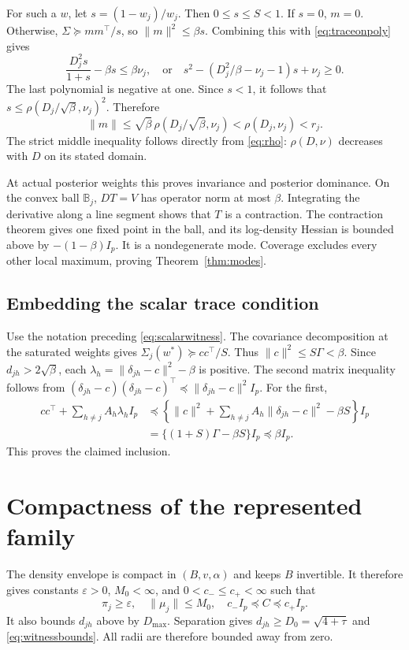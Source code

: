 \documentclass[12pt,a4paper]{article}
\theoremstyle{remark}
\begin{document}
For such a $w$, let $s=(1-w_j)/w_j$. Then $0\le s\le S<1$. If $s=0$, $m=0$. Otherwise, $\Sigma\succeq mm^\top/s$, so $\|m\|^2\le\beta s$. Combining this with \eqref{eq:traceonpoly} gives
\[
 \frac{D_j^2s}{1+s}-\beta s\le\beta\nu_j,
 \quad\text{or}\quad
 s^2-(D_j^2/\beta-\nu_j-1)s+\nu_j\ge0.
\]
The last polynomial is negative at one. Since $s<1$, it follows that
$s\le\rho(D_j/\sqrt\beta,\nu_j)^2$. Therefore
\[
 \|m\|\le\sqrt\beta\,\rho(D_j/\sqrt\beta,\nu_j)
           <\rho(D_j,\nu_j)<r_j.
\]
The strict middle inequality follows directly from \eqref{eq:rho}: $\rho(D,\nu)$ decreases with $D$ on its stated domain.

At actual posterior weights this proves invariance and posterior dominance. On the convex ball $\mathbb B_j$, $DT=V$ has operator norm at most $\beta$. Integrating the derivative along a line segment shows that $T$ is a contraction. The contraction theorem gives one fixed point in the ball, and its log-density Hessian is bounded above by $-(1-\beta)I_p$. It is a nondegenerate mode. Coverage excludes every other local maximum, proving Theorem~\ref{thm:modes}.

\subsection{Embedding the scalar trace condition}

Use the notation preceding \eqref{eq:scalarwitness}. The covariance decomposition at the saturated weights gives
$\Sigma_j(w^*)\succeq cc^\top/S$. Thus $\|c\|^2\le S\Gamma<\beta$. Since $d_{jh}>2\sqrt\beta$, each
$\lambda_h=\|\delta_{jh}-c\|^2-\beta$ is positive. The second matrix inequality follows from
$(\delta_{jh}-c)(\delta_{jh}-c)^\top\preceq
\|\delta_{jh}-c\|^2I_p$. For the first,
\begin{align*}
 cc^\top+\sum_{h\ne j}A_h\lambda_h I_p
 &\preceq\left\{\|c\|^2+\sum_{h\ne j}A_h\|\delta_{jh}-c\|^2-\beta S\right\}I_p\\
 &=\{(1+S)\Gamma-\beta S\}I_p
 \preceq\beta I_p.
\end{align*}
This proves the claimed inclusion.

\section{Compactness of the represented family}\label{app:compactness}

The density envelope is compact in $(B,v,\alpha)$ and keeps $B$ invertible. It therefore gives constants $\varepsilon>0$, $M_0<\infty$, and $0<c_-\le c_+<\infty$ such that
\begin{equation}\label{eq:originalenvelope}
 \pi_j\ge\varepsilon,\quad \|\mu_j\|\le M_0,\quad
 c_-I_p\preceq C\preceq c_+I_p.
\end{equation}
It also bounds $d_{jh}$ above by $D_{\max}$. Separation gives $d_{jh}\ge D_0=\sqrt{4+\tau}$ and \eqref{eq:witnessbounds}. All radii are therefore bounded away from zero.
\end{document}
